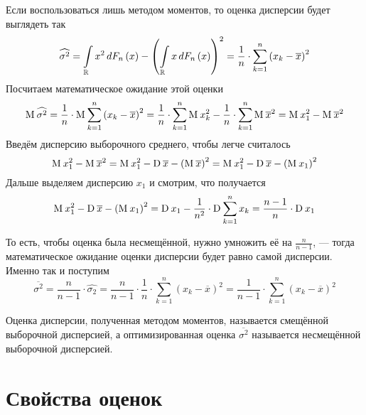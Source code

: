 Если воспользоваться лишь методом моментов, то оценка дисперсии будет выглядеть
так
\begin{equation*}
  \widehat{\sigma^2}
  = \integrall{\mathbb{R}}{dF_n\left( x \right)}{x^2}
    - \left( \integrall{\mathbb{R}}{dF_n\left( x \right)}{x} \right)^2
  = \frac{1}{n} \cdot \sum_{k=1}^n \left( x_k-\overline{x} \right)^2
\end{equation*}
Посчитаем математическое ожидание этой оценки
\begin{equation*}
  \mean{\widehat{\sigma^2}}
  = \frac{1}{n} \cdot \mean{\sum_{k=1}^n \left( x_k-\overline{x} \right)^2}
  = \frac{1}{n} \cdot \sum_{k=1}^{n} \mean{x_k^2}
    - \frac{1}{n} \cdot \sum_{k=1}^{n} \mean{\overline{x}^2}
  = \mean{x_1^2} - \mean{\overline{x}^2}
\end{equation*}
Введём дисперсию выборочного среднего, чтобы легче считалось
\begin{equation*}
  \mean{x_1^2} - \mean{\overline{x}^2}
  = \mean{x_1^2} - \dispersion{\overline{x}}
    - \left( \mean{\overline{x}} \right)^2
  = \mean{x_1^2} - \dispersion{\overline{x}} - \left( \mean{x_1} \right)^2
\end{equation*}
Дальше выделяем дисперсию $x_1$ и смотрим, что получается
\begin{equation*}
  \mean{x_1^2} - \dispersion{\overline{x}} - \left( \mean{x_1} \right)^2
  = \dispersion{x_1} - \frac{1}{n^2} \cdot \dispersion{\sum_{k=1}^{n} x_k}
  = \frac{n-1}{n} \cdot \dispersion{x_1}
\end{equation*}

То есть, чтобы оценка была несмещённой, нужно умножить её на $\frac{n}{n-1}$,
--- тогда математическое ожидание оценки дисперсии будет равно самой дисперсии.
Именно так и поступим
\begin{equation*}
  \overline{\sigma^2}
  = \frac{n}{n-1} \cdot \widehat{\sigma_2}
  = \frac{n}{n-1} \cdot \frac{1}{n}
    \cdot \sum_{k=1}^n \left( x_k-\overline{x} \right)^2
  = \frac{1}{n-1} \cdot \sum_{k=1}^n \left( x_k-\overline{x} \right)^2
\end{equation*}

Оценка дисперсии, полученная методом моментов, называется смещённой выборочной
дисперсией, а оптимизированная оценка $\overline{\sigma^2}$ называется
несмещённой выборочной дисперсией.

\section{Свойства оценок}
